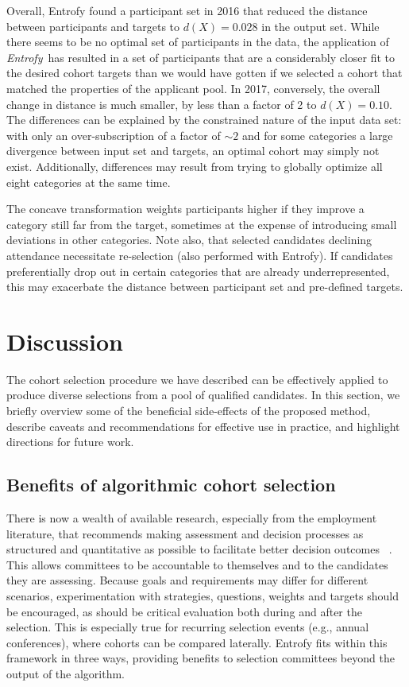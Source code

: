 \documentclass[10pt,letterpaper]{article}
\newcommand{\project}[1]{\textsl{#1}}
\newcommand{\entrofy}{\project{Entrofy}}
\begin{document}
Overall, Entrofy found a participant set in 2016 that reduced the distance between participants and targets to $d(X)=0.028$ in the output set. While there seems to be no optimal set of participants in the data, the application of \entrofy\ has resulted in a set of participants that are a considerably closer fit to the desired cohort targets than we would have gotten if we selected a cohort that matched the properties of the applicant pool.
In 2017, conversely, the overall change in distance is much smaller, by less than a factor of 2 to $d(X)=0.10$.
The differences can be explained by the constrained nature of the input data set: with only an over-subscription of a factor of $\sim 2$ and for some categories a large divergence between input set and targets, an optimal cohort may simply not exist.
Additionally, differences may result from trying to globally optimize all eight categories at the same time.

The concave transformation weights participants higher if they improve a category still far from the target, sometimes at the expense of introducing small deviations in other categories.
Note also, that selected candidates declining attendance necessitate re-selection (also performed with Entrofy).
If candidates preferentially drop out in certain categories that are already underrepresented, this may exacerbate the distance between participant set and pre-defined targets.

\section*{Discussion}
\label{sec:discussion}

The cohort selection procedure we have described can be effectively applied to produce diverse selections from a pool of qualified candidates.
In this section, we briefly overview some of the beneficial side-effects of the proposed method, describe caveats and recommendations for effective use in practice, and highlight directions for future work.

\subsection*{Benefits of algorithmic cohort selection}
There is now a wealth of available research, especially from the employment literature, that recommends making assessment and decision processes as structured and quantitative as possible to facilitate better decision outcomes ~\cite{sunstein2015wiser}.
This allows committees to be accountable to themselves and to the candidates they are assessing.
Because goals and requirements may differ for different scenarios, experimentation with strategies, questions, weights and targets should be encouraged, as should be critical evaluation both during and after the selection.
This is especially true for recurring selection events (e.g., annual conferences), where cohorts can be compared laterally.
Entrofy fits within this framework in three ways, providing benefits to selection committees beyond the output of the algorithm.
\end{document}
